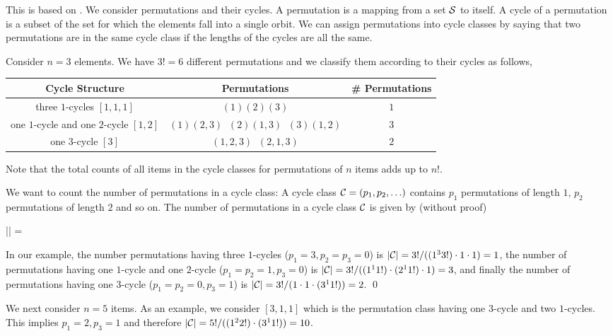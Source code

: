 
This is based on \cite{Dominus2007}. We consider permutations and their cycles. A permutation is a mapping from a set $\mathcal{S}$ to itself. A cycle of a permutation is a subset of the set for which the elements fall into a single orbit. We can assign permutations into cycle classes by saying that two permutations are in the same cycle class if the lengths of the cycles are all the same.

Consider $n = 3$ elements. We have $3! = 6$ different permutations and we classify them according to their cycles as follows,

\vspace{2mm}

\begin{tabular}{|c|c|c|}
  Cycle Structure & Permutations & \# Permutations \\ \hline
  three $1$-cycles $[1,1,1] $ & $(1)(2)(3)$ & $1$ \\
  one $1$-cycle and one $2$-cycle $[1,2]$ & $(1)(2,3) \;\; (2)(1,3) \;\; (3)(1,2)$ & $3$ \\
  one $3$-cycle $[3]$ & $(1,2,3) \;\; (2,1,3)$ & $2$
\end{tabular}

\vspace{2mm}

Note that the total counts of all items in the cycle classes for permutations of $n$ items adds up to $n!$.

We want to count the number of permutations in a cycle class: A cycle class $\mathcal{C}=(p_1, p_2, \ldots)$ contains $p_1$ permutations of length $1$, $p_2$ permutations of length $2$ and so on. The number of permutations in a cycle class $\mathcal{C}$ is given by (without proof)

\bee
|\Cc| = 
\eee

In our example, the number permutations having three $1$-cycles ($p_1 = 3, p_2=p_3=0$) is $|\mathcal{C}| = 3! / ((1^3 3!) \cdot 1 \cdot 1) = 1$, the number of permutations having one $1$-cycle and one $2$-cycle ($p_1 = p_2 = 1, p_3=0$) is $|\mathcal{C}| = 3! / ((1^1 1!) \cdot (2^1 1!) \cdot 1) = 3$, and finally the number of permutations having one $3$-cycle ($p_1=p_2=0, p_3 = 1$) is $|\mathcal{C}| = 3! / (1 \cdot 1 \cdot (3^1 1!)) = 2$. \qed

We next consider $n=5$ items. As an example, we consider $[3,1,1]$ which is the permutation class having one $3$-cycle and two $1$-cycles. This implies $p_1=2, p_3=1$ and therefore $|\mathcal{C}| = 5! / ((1^2 2!) \cdot (3^1 1!)) = 10$. 

